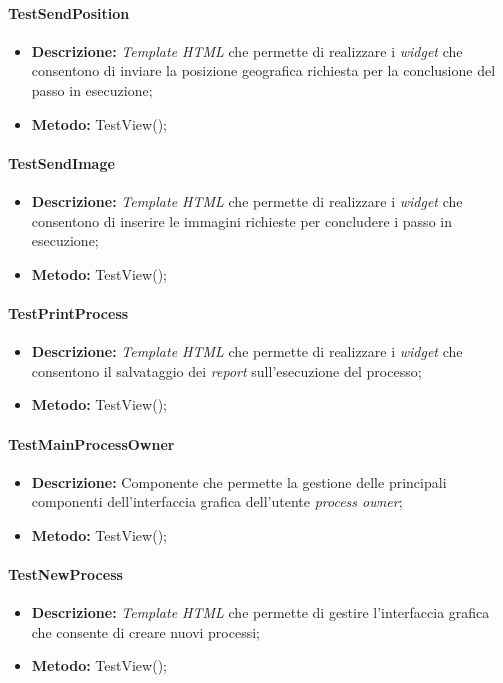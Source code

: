 \paragraph{TestSendPosition}
\begin{itemize}
\item \textbf{Descrizione:} \textit{Template HTML} che permette  di realizzare i \textit{widget} che consentono di inviare la posizione geografica richiesta per la conclusione del passo in esecuzione;
\item \textbf{Metodo:} TestView();
\end{itemize}

\paragraph{TestSendImage}
\begin{itemize}
\item \textbf{Descrizione:} \textit{Template HTML} che permette di realizzare i \textit{widget} che consentono di inserire le immagini richieste per concludere i passo in esecuzione;
\item \textbf{Metodo:} TestView();
\end{itemize}

\paragraph{TestPrintProcess}
\begin{itemize}
\item \textbf{Descrizione:} \textit{Template HTML} che permette di realizzare i \textit{widget} che consentono il salvataggio dei \textit{report} sull'esecuzione del processo;
\item \textbf{Metodo:} TestView();
\end{itemize}

\paragraph{TestMainProcessOwner}
\begin{itemize}
\item \textbf{Descrizione:} Componente che permette la gestione delle principali componenti dell'interfaccia grafica dell'utente \textit{process owner};
\item \textbf{Metodo:} TestView();
\end{itemize}

\paragraph{TestNewProcess}
\begin{itemize}
\item \textbf{Descrizione:} \textit{Template HTML} che permette di gestire l'interfaccia grafica che consente di creare nuovi processi;
\item \textbf{Metodo:} TestView();
\end{itemize}

